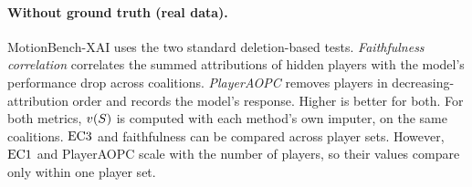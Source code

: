 \paragraph{Without ground truth (real data).} MotionBench-XAI uses the two standard deletion-based tests. \emph{Faithfulness correlation} \citep{bhatt2020evaluating} correlates the summed attributions of hidden players with the model's performance drop across coalitions. \emph{PlayerAOPC} \citep{samek2017evaluating} removes players in decreasing-attribution order and records the model's response. Higher is better for both. For both metrics, $v(S)$ is computed with each method's own imputer, on the same coalitions. $\mathrm{EC3}$ and faithfulness can be compared across player sets. However, $\mathrm{EC1}$ and PlayerAOPC scale with the number of players, so their values compare only within one player set.
